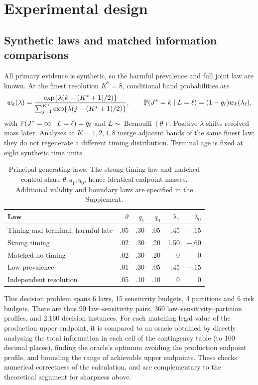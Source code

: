 \section{Experimental design}\label{sec:design}
\subsection{Synthetic laws and matched information comparisons}
All primary evidence is synthetic, so the harmful prevalence and full joint law are known. At the finest resolution $K^*=8$, conditional band probabilities are
\begin{equation}\label{eq:law}
 w_k(\lambda)=\frac{\exp\{\lambda(k-(K^*+1)/2)\}}
 {\sum_{j=1}^{K^*}\exp\{\lambda(j-(K^*+1)/2)\}},\qquad
 \mathbb P(J^*=k\mid L=\ell)=(1-q_\ell)w_k(\lambda_\ell),
\end{equation}
with $\mathbb P(J^*=\infty\mid L=\ell)=q_\ell$ and $L\sim\operatorname{Bernoulli}(\theta)$. Positive $\lambda$ shifts resolved mass later. Analyses at $K=1,2,4,8$ merge adjacent bands of the same finest law; they do not regenerate a different timing distribution. Terminal age is fixed at eight synthetic time units.

\begin{table}[!htbp]\centering
\caption{Principal generating laws. The strong-timing law and matched control share $\theta,q_1,q_0$, hence identical endpoint masses. Additional validity and boundary laws are specified in the Supplement.}\label{tab:laws}
\begin{tabular}{lrrrrr}\toprule
Law & $\theta$ & $q_1$ & $q_0$ & $\lambda_1$ & $\lambda_0$\\\midrule
Timing and terminal, harmful late & .05 & .30 & .05 & .45 & $-.15$\\
Strong timing & .02 & .30 & .20 & 1.50 & $-.60$\\
Matched no timing & .02 & .30 & .20 & 0 & 0\\
Low prevalence & .01 & .30 & .05 & .45 & $-.15$\\
Independent resolution & .05 & .10 & .10 & 0 & 0\\\bottomrule
\end{tabular}
\end{table}

This decision problem spans 6 laws, 15 sensitivity budgets, 4 partitions and 6 risk budgets. There are thus 90 law--sensitivity pairs, 360 law--sensitivity--partition profiles, and 2,160 decision instances. For each matching legal value of the production upper endpoint, it is compared to an oracle obtained by directly analysing the total information in each cell of the contingency table (to 100 decimal places), finding the oracle's optimum avoiding the production endpoint profile, and bounding the range of achievable upper endpoints. These checks numerical correctness of the calculation, and are complementary to the theoretical argument for sharpness above.

